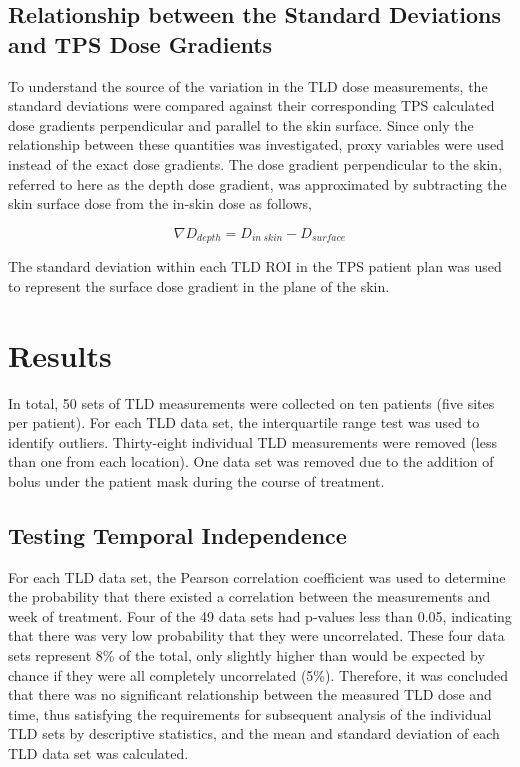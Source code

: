 \subsection{Relationship between the Standard Deviations and TPS Dose Gradients}
To understand the source of the variation in the TLD dose measurements, the standard deviations were compared against their corresponding TPS calculated dose gradients perpendicular and parallel to the skin surface. Since only the relationship between these quantities was investigated, proxy variables were used instead of the exact dose gradients. The dose gradient perpendicular to the skin, referred to here as the depth dose gradient, was approximated by subtracting the skin surface dose from the in-skin dose as follows,

\begin{equation}
	\nabla D_{depth} = D_{in~skin} - D_{surface}	
\end{equation}

The standard deviation within each TLD ROI in the TPS patient plan was used to represent the surface dose gradient in the plane of the skin.

\section{Results}
In total, 50 sets of TLD measurements were collected on ten patients (five sites per patient). For each TLD data set, the interquartile range test was used to identify outliers. Thirty-eight individual TLD measurements were removed (less than one from each location). One data set was removed due to the addition of bolus under the patient mask during the course of treatment.

\subsection{Testing Temporal Independence}
For each TLD data set, the Pearson correlation coefficient was used to determine the probability that there existed a correlation between the measurements and week of treatment. Four of the 49 data sets had p-values less than 0.05, indicating that there was very low probability that they were uncorrelated. These four data sets represent 8\% of the total, only slightly higher than would be expected by chance if they were all completely uncorrelated (5\%). Therefore, it was concluded that there was no significant relationship between the measured TLD dose and time, thus satisfying the requirements for subsequent analysis of the individual TLD sets by descriptive statistics, and the mean and standard deviation of each TLD data set was calculated.

